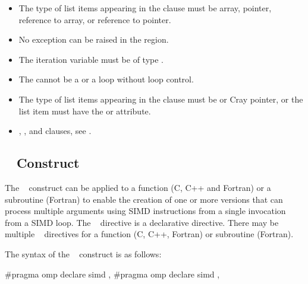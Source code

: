 \begin{itemize}
\cppspecificstart
\item The type of list items appearing in the  clause must be array, pointer, 
reference to array, or reference to pointer. 

\item No exception can be raised in the  region. 
\cppspecificend

\fortranspecificstart
\item The  iteration variable must be of type .

\item The  cannot be a  or a  loop without loop control. 

\item The type of list items appearing in the  clause must be  or Cray 
pointer, or the list item must have the  or  attribute.
\fortranspecificend
\end{itemize}

\crossreferences
\begin{itemize}
\item {}, ,  and  clauses, see 
.
\end{itemize}








\subsection{~ Construct}
\label{subsec:declare simd Construct}
\summary
The ~ construct can be applied to a function (C, C++ and Fortran) or a 
subroutine (Fortran) to enable the creation of one or more versions that can process 
multiple arguments using SIMD instructions from a single invocation from a SIMD 
loop. The ~ directive is a declarative directive. There may be multiple 
~ directives for a function (C, C++, Fortran) or subroutine (Fortran).

\syntax
The syntax of the ~ construct is as follows:

\ccppspecificstart
\begin{boxedcode}
\#pragma omp declare simd \plc{[clause[ [},\plc{] clause] ... ] new-line}
\plc{[}\#pragma omp declare simd \plc{[clause[ [},\plc{] clause] ... ] new-line]}
\plc{[ ... ]}
\end{boxedcode}

